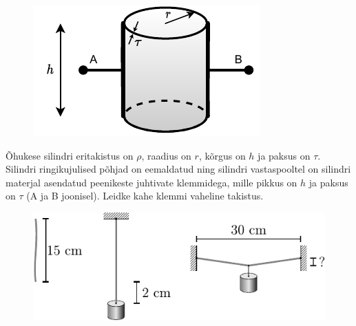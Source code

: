 \documentclass[10pt]{article}
\begin{document}

\begin{figure}
  \vspace{-2em}
  \begin{center}
    \includegraphics[width=\linewidth]{2022-v3g-03-yl.pdf}
  \end{center}
  \vspace{-2em}
\end{figure}

Õhukese silindri eritakistus on $\rho$, raadius on $r$, kõrgus on $h$ ja paksus on $\tau$. Silindri ringikujulised põhjad on eemaldatud ning silindri vastaspooltel on silindri materjal asendatud peenikeste juhtivate klemmidega, mille pikkus on $h$ ja paksus on $\tau$ (A ja B joonisel). Leidke kahe klemmi vaheline takistus.
\probend
\bigskip


\begin{figure}
    \begin{center}
        \vspace{5pt}
        \includegraphics[width=\linewidth]{2023-lahg-03-yl.pdf}
    \end{center}
\end{figure}
\end{document}
